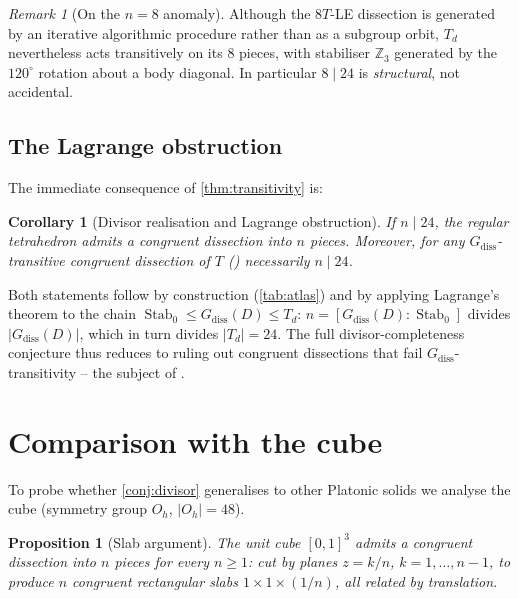 \documentclass[11pt,a4paper]{article}
\theoremstyle{plain}
\newtheorem{proposition}[proposition]{Proposition}
\newtheorem{corollary}[corollary]{Corollary}
\theoremstyle{definition}
\theoremstyle{remark}
\newtheorem{remark}[remark]{Remark}
\DeclareMathOperator{\Stab}{Stab}
\newcommand{\Td}{T_{\!d}}
\newcommand{\Z}{\mathbb{Z}}
\begin{document}
\begin{remark}[On the $n=8$ anomaly]\label{rem:n8-anomaly}
Although the $8T$-LE dissection is generated by an iterative algorithmic
procedure rather than as a subgroup orbit, $\Td$ nevertheless acts
transitively on its $8$ pieces, with stabiliser $\Z_{3}$ generated by the
$120^{\circ}$ rotation about a body diagonal.  In particular $8 \mid 24$ is
\emph{structural}, not accidental.
\end{remark}

\subsection{The Lagrange obstruction}\label{ssec:lagrange}

The immediate consequence of \cref{thm:transitivity} is:

\begin{corollary}[Divisor realisation and Lagrange obstruction]\label{cor:forward}
If $n \mid 24$, the regular tetrahedron admits a congruent dissection into
$n$ pieces.  Moreover, for any $G_{\mathrm{diss}}$-transitive congruent
dissection of $T$ () necessarily $n \mid 24$.
\end{corollary}

Both statements follow by construction (\cref{tab:atlas}) and by applying
Lagrange's theorem to the chain $\Stab_{0} \leq G_{\mathrm{diss}}(D) \leq \Td$:
$n = [G_{\mathrm{diss}}(D) : \Stab_{0}]$ divides $|G_{\mathrm{diss}}(D)|$,
which in turn divides $|\Td| = 24$.  The full
divisor-completeness conjecture thus reduces to ruling out congruent
dissections that fail $G_{\mathrm{diss}}$-transitivity -- the subject of
.

\section{Comparison with the cube}\label{sec:cube}

To probe whether \cref{conj:divisor} generalises to other Platonic solids
we analyse the cube (symmetry group $O_{h}$, $|O_{h}| = 48$).

\begin{proposition}[Slab argument]\label{prop:slab}
The unit cube $[0,1]^{3}$ admits a congruent dissection into $n$ pieces for
\emph{every} $n \geq 1$: cut by planes $z = k/n$, $k = 1,\ldots,n-1$, to
produce $n$ congruent rectangular slabs $1 \times 1 \times (1/n)$, all
related by translation.
\end{proposition}
\end{document}

